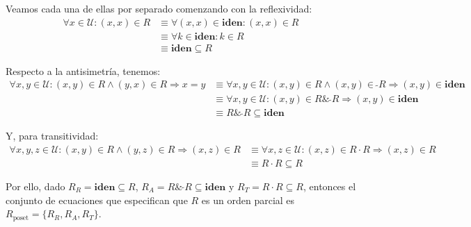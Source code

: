 \documentclass{article}
\newcommand{\U}{\mathcal{U}}
\newcommand{\iden}{\textbf{iden}}
\newcommand{\conv}[1]{\ \tilde{}#1}
\begin{document}
Veamos cada una de ellas por separado comenzando con la reflexividad:
\begin{equation*}
  \begin{aligned}
    \forall x \in \U : (x, x) \in R &\equiv \forall (x, x) \in \iden : (x, x) \in R \\ 
                                    &\equiv \forall k \in \iden : k \in R \\ 
                                    &\equiv \iden \subseteq R
  \end{aligned}
\end{equation*}

Respecto a la antisimetría, tenemos:
\begin{equation*}
  \begin{aligned}
    \forall x, y \in \U : (x, y) \in R \land (y, x) \in R \Rightarrow x = y &\equiv \forall x, y \in \U : (x, y) \in R \land (x, y) \in \conv{R} \Rightarrow (x, y) \in \iden \\ 
                                                                            &\equiv \forall x, y \in \U : (x, y) \in R \& \conv{R} \Rightarrow (x, y) \in \iden \\ 
                                                                            &\equiv R \& \conv{R} \subseteq \iden
  \end{aligned}
\end{equation*}

Y, para transitividad:
\begin{equation*}
  \begin{aligned}
    \forall x, y, z \in \U : (x, y) \in R \land (y, z) \in R \Rightarrow (x, z) \in R &\equiv \forall x, z \in \U : (x, z) \in R \cdot R \Rightarrow (x, z) \in R \\ 
                                                                                      &\equiv R \cdot R \subseteq R
  \end{aligned}
\end{equation*}

Por ello, dado $R_R = \iden \subseteq R$, $R_A = R \& \conv{R} \subseteq \iden$ y $R_T = R \cdot R \subseteq R$, entonces el conjunto de ecuaciones que especifican que $R$ es un orden parcial es $R_\text{poset} = \{R_R, R_A, R_T\}$.
\end{document}
